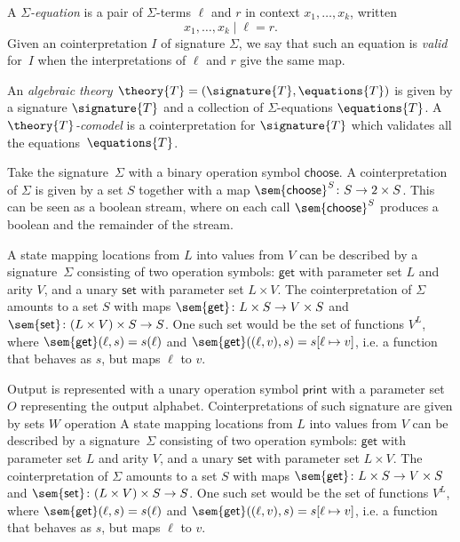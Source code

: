 A \emph{$\Sigma$-equation} is a pair of $\Sigma$-terms $\ell$ and $r$ in context $x_1, \ldots, x_k$, written
%
\begin{equation*}
  x_1, \ldots, x_k \mid \ell = r.
\end{equation*}
%
Given an cointerpretation $I$ of signature $\Sigma$, we say that such an equation is \emph{valid} for~$I$ when the interpretations of $\ell$ and $r$ give the same map.

An \emph{algebraic theory $\theory{T} = (\signature{T}, \equations{T})$} is
given by a signature $\signature{T}$ and a collection of $\Sigma$-equations
$\equations{T}$. A \emph{$\theory{T}$-comodel} is a cointerpretation for
$\signature{T}$ which validates all the equations~$\equations{T}$.

\begin{example}
Take the signature~$\Sigma$ with a binary operation symbol $\mathsf{choose}$. A cointerpretation of $\Sigma$ is given by a set $S$ together with a map $\sem{\mathsf{choose}}^S \colon S \to 2 \times S$. This can be seen as a boolean stream, where on each call $\sem{\mathsf{choose}}^S$ produces a boolean and the remainder of the stream.
\end{example}

\begin{example}
A state mapping locations from $L$ into values from $V$ can be described by a signature~$\Sigma$ consisting of two operation symbols: $\mathsf{get}$ with parameter set $L$ and arity $V$, and a unary $\mathsf{set}$ with parameter set $L \times V$. The cointerpretation of $\Sigma$ amounts to a set $S$ with maps $\sem{\mathsf{get}} \colon L \times S \to V \times S$ and $\sem{\mathsf{set}} \colon (L \times V) \times S \to S$. One such set would be the set of functions $V^L$, where $\sem{\mathsf{get}}(\ell, s) = s(\ell)$ and $\sem{\mathsf{get}}((\ell, v), s) = s[\ell \mapsto v]$, i.e. a function that behaves as $s$, but maps $\ell$ to $v$.
\end{example}

\begin{example}
Output is represented with a unary operation symbol $\mathsf{print}$ with a parameter set $O$ representing the output alphabet. Cointerpretations of such signature are given by sets $W$ operation A state mapping locations from $L$ into values from $V$ can be described by a signature~$\Sigma$ consisting of two operation symbols: $\mathsf{get}$ with parameter set $L$ and arity $V$, and a unary $\mathsf{set}$ with parameter set $L \times V$. The cointerpretation of $\Sigma$ amounts to a set $S$ with maps $\sem{\mathsf{get}} \colon L \times S \to V \times S$ and $\sem{\mathsf{set}} \colon (L \times V) \times S \to S$. One such set would be the set of functions $V^L$, where $\sem{\mathsf{get}}(\ell, s) = s(\ell)$ and $\sem{\mathsf{get}}((\ell, v), s) = s[\ell \mapsto v]$, i.e. a function that behaves as $s$, but maps $\ell$ to $v$.
\end{example}



